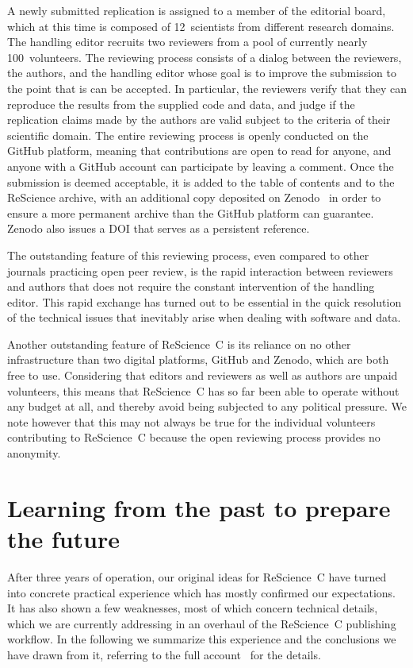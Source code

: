 \documentclass[runningheads]{llncs}
\begin{document}
A newly submitted replication is assigned to a member of the editorial board, which at this time is composed of 12~scientists from different research domains. The handling editor recruits two reviewers from a pool of currently nearly 100~volunteers. The reviewing process consists of a dialog between the reviewers, the authors, and the handling editor whose goal is to improve the submission to the point that is can be accepted. In particular, the reviewers verify that they can reproduce the results from the supplied code and data, and judge if the replication claims made by the authors are valid subject to the criteria of their scientific domain. The entire reviewing process is openly conducted on the GitHub platform, meaning that contributions are open to read for anyone, and anyone with a GitHub account can participate by leaving a comment. Once the submission is deemed acceptable, it is added to the table of contents and to the ReScience archive, with an additional copy deposited on Zenodo~\cite{Zenodo} in order to ensure a more permanent archive than the GitHub platform can guarantee. Zenodo also issues a DOI that serves as a persistent reference.

The outstanding feature of this reviewing process, even compared to other journals practicing open peer review, is the rapid interaction between reviewers and authors that does not require the constant intervention of the handling editor. This rapid exchange has turned out to be essential in the quick resolution of the technical issues that inevitably arise when dealing with software and data.

Another outstanding feature of ReScience~C is its reliance on no other infrastructure than two digital platforms, GitHub and Zenodo, which are both free to use. Considering that editors and reviewers as well as authors are unpaid volunteers, this means that ReScience~C has so far been able to operate without any budget at all, and thereby avoid being subjected to any political pressure. We note however that this may not always be true for the individual volunteers contributing to ReScience~C because the open reviewing process provides no anonymity.

\section{Learning from the past to prepare the future}

After three years of operation, our original ideas for ReScience~C have turned into concrete practical experience which has mostly confirmed our expectations. It has also shown a few weaknesses, most of which concern technical details, which we are currently addressing in an overhaul of the ReScience~C publishing workflow. In the following we summarize this experience and the conclusions we have drawn from it, referring to the full account~\cite{RougierSustainablecomputationalscience2017} for the details.
\end{document}
